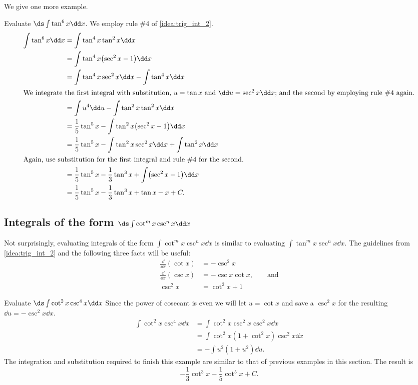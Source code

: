 We give one more example.

\begin{example}\label{ex_trigint7}
Evaluate $\ds\int\tan^6x\dd x$.
\solution
We employ rule \#4 of \autoref{idea:trig_int_2}. 
\begin{align*}
	\int \tan^6x\dd x
	&= \int \tan^4x\tan^2x\dd x \\
	&= \int\tan^4x\bigl(\sec^2x-1\bigr)\dd x\\
	&= \int\tan^4x\sec^2x\dd x - \int\tan^4x\dd x \\
\intertext{We integrate the first integral with substitution, $u=\tan x$ and $\dd u=\sec^2x\dd x$; and the second by employing rule \#4 again.}
	&= \int u^4\dd u-\int\tan^2 x\tan^2 x\dd x \\
	&=	\frac15\tan^5x-\int\tan^2x\bigl(\sec^2x-1\bigr)\dd x \\
	&= \frac15\tan^5x -\int\tan^2x\sec^2x\dd x + \int\tan^2x\dd x\\
\intertext{Again, use substitution for the first integral and rule \#4 for the second.}
	&= \frac15\tan^5x-\frac13\tan^3x+\int\bigl(\sec^2x-1\bigr)\dd x \\
	&=	 \frac15\tan^5x-\frac13\tan^3x+\tan x - x+C.
\end{align*}
\end{example}

\subsection{Integrals of the form \texorpdfstring{$\ds\int\cot^mx\csc^nx\dd x$}{∫(cot x)\^{}m (csc x)\^{}n dx}}

Not surprisingly, evaluating integrals of the form $\int\cot^mx\csc^nx\dd x$ is similar to evaluating $\int\tan^mx\sec^nx\dd x$. The guidelines from \autoref{idea:trig_int_2} and the following three facts will be useful:
\begin{align*}
 \frac{\dd}{\dd x}(\cot x) &= -\csc^2x \\
 \frac{\dd}{\dd x}(\csc x) &= -\csc x\cot x,\qquad\text{and} \\
 \csc^2 x &= \cot^2x+1
\end{align*}

\begin{example}\label{ex_int_cot_csc}
Evaluate $\ds\int\cot^2x\csc^4x\dd x$
\solution
Since the power of cosecant is even we will let $u=\cot x$ and save a $\csc^2x$ for the resulting $\dd u=-\csc^2x\dd x$.
\begin{align*}
 \int\cot^2x\csc^4x\dd x
 &=\int\cot^2x\csc^2x\csc^2x\dd x \\
 &=\int\cot^2x(1+\cot^2x)\csc^2x\dd x \\
 &=-\int u^2(1+u^2)\dd u.
\end{align*}
The integration and substitution required to finish this example are similar to that of previous examples in this section. The result is
\[-\frac13\cot^3x-\frac15\cot^5x+C.\]
\end{example}

